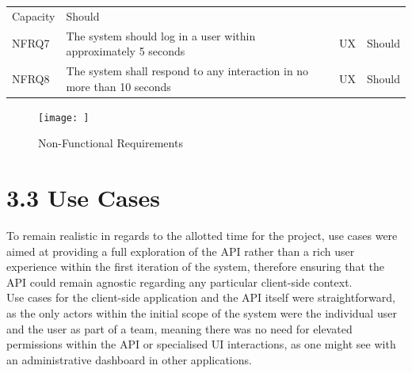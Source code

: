 \begin{longtable}[]{@{}llll@{}}
\begin{minipage}[t]{0.10\columnwidth}
Capacity\strut
\end{minipage} & \begin{minipage}[t]{0.11\columnwidth}\raggedright\strut
Should\strut
\end{minipage}\tabularnewline
\begin{minipage}[t]{0.05\columnwidth}\raggedright\strut
NFRQ7\strut
\end{minipage} & \begin{minipage}[t]{0.63\columnwidth}\raggedright\strut
The system should log in a user within approximately 5 seconds\strut
\end{minipage} & \begin{minipage}[t]{0.10\columnwidth}\raggedright\strut
UX\strut
\end{minipage} & \begin{minipage}[t]{0.11\columnwidth}\raggedright\strut
Should\strut
\end{minipage}\tabularnewline
\begin{minipage}[t]{0.05\columnwidth}\raggedright\strut
NFRQ8\strut
\end{minipage} & \begin{minipage}[t]{0.63\columnwidth}\raggedright\strut
The system shall respond to any interaction in no more than 10
seconds\strut
\end{minipage} & \begin{minipage}[t]{0.10\columnwidth}\raggedright\strut
UX\strut
\end{minipage} & \begin{minipage}[t]{0.11\columnwidth}\raggedright\strut
Should\strut
\end{minipage}\tabularnewline
\bottomrule
\end{longtable}

\begin{figure}[htbp]
\centering
\texttt{[image: ]}
\caption{Non-Functional Requirements}
\end{figure}

\section{3.3 Use Cases}\label{use-cases}

To remain realistic in regards to the allotted time for the project, use
cases were aimed at providing a full exploration of the API rather than
a rich user experience within the first iteration of the system,
therefore ensuring that the API could remain agnostic regarding any
particular client-side context.\\
Use cases for the client-side application and the API itself were
straightforward, as the only actors within the initial scope of the
system were the individual user and the user as part of a team, meaning
there was no need for elevated permissions within the API or specialised
UI interactions, as one might see with an administrative dashboard in
other applications.

